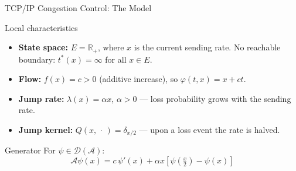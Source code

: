 \documentclass[aspectratio=169]{beamer}
\begin{document}
\begin{frame}{TCP/IP Congestion Control: The Model}

  \begin{block}{Local characteristics}
    \begin{itemize}
      \setlength\itemsep{6pt}
      \item \textbf{State space:} $E = \mathbb{R}_+$, where $x$ is
            the current sending rate. No reachable boundary:
            $t^*(x) = \infty$ for all $x \in E$.
      \item \textbf{Flow:} $f(x) = c > 0$ (additive increase), so
            $\varphi(t,x) = x + ct$.
      \item \textbf{Jump rate:} $\lambda(x) = \alpha x$, $\alpha > 0$
            --- loss probability grows with the sending rate.
      \item \textbf{Jump kernel:} $Q(x,\,\cdot\,) = \delta_{x/2}$
            --- upon a loss event the rate is halved.
    \end{itemize}
  \end{block}

  \bigskip
  \begin{block}{Generator}
    For $\psi \in \mathcal{D}(\mathcal{A})$:
    \[
      \mathcal{A}\psi(x)
      = c\,\psi'(x) + \alpha x\left[\psi\!\left(\tfrac{x}{2}\right)
      - \psi(x)\right]
    \]
  \end{block}

\end{frame}
\end{document}

